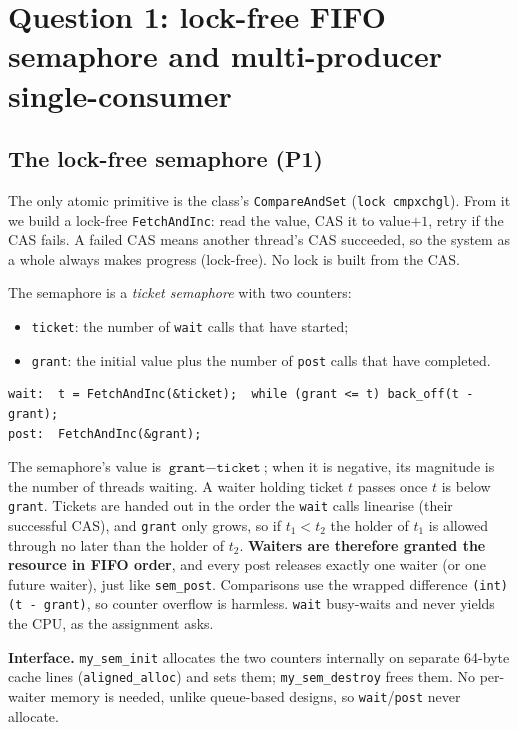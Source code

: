 \documentclass[10pt,a4paper]{article}
\begin{document}
\section{Question 1: lock-free FIFO semaphore and multi-producer single-consumer}

\subsection{The lock-free semaphore (P1)}
The only atomic primitive is the class's \texttt{CompareAndSet} (\texttt{lock cmpxchgl}). From it we build a lock-free
\texttt{FetchAndInc}: read the value, CAS it to value$+1$, retry if the CAS fails. A failed CAS means another
thread's CAS succeeded, so the system as a whole always makes progress (lock-free). No lock is built from the CAS.

The semaphore is a \emph{ticket semaphore} with two counters:
\begin{itemize}
\item \texttt{ticket}: the number of \texttt{wait} calls that have started;
\item \texttt{grant}: the initial value plus the number of \texttt{post} calls that have completed.
\end{itemize}
\begin{lstlisting}
wait:  t = FetchAndInc(&ticket);  while (grant <= t) back_off(t - grant);
post:  FetchAndInc(&grant);
\end{lstlisting}
The semaphore's value is $\texttt{grant}-\texttt{ticket}$; when it is negative, its magnitude is the number of threads waiting.
A waiter holding ticket $t$ passes once $t$ is below \texttt{grant}. Tickets are handed out in the order the \texttt{wait}
calls linearise (their successful CAS), and \texttt{grant} only grows, so if $t_1 < t_2$ the holder of $t_1$ is allowed through no later than
the holder of $t_2$. \textbf{Waiters are therefore granted the resource in FIFO order}, and every post releases exactly one waiter (or one future waiter),
just like \texttt{sem\_post}. Comparisons use the wrapped difference \texttt{(int)(t - grant)}, so counter overflow is harmless.
\texttt{wait} busy-waits and never yields the CPU, as the assignment asks.

\textbf{Interface.} \texttt{my\_sem\_init} allocates the two counters internally on separate 64-byte cache lines (\texttt{aligned\_alloc}) and sets them;
\texttt{my\_sem\_destroy} frees them. No per-waiter memory is needed, unlike queue-based designs, so \texttt{wait}/\texttt{post} never allocate.
\end{document}

